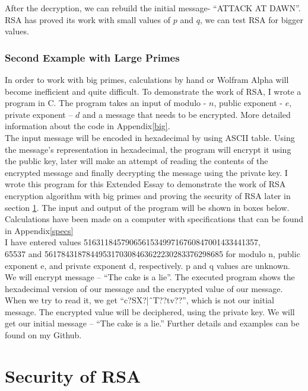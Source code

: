 \documentclass[a4paper, 12pt]{article}
\begin{document}
After the decryption, we can rebuild the initial message- “ATTACK AT DAWN”.
RSA has proved its work with small values of $p$ and $q$, we can test RSA for bigger values.\\

\subsubsection{Second Example with Large Primes}
\label{bbsec:second}

In order to work with big primes, calculations by hand or Wolfram Alpha will become inefficient
and quite difficult. To demonstrate the work of RSA, I wrote a program in C. 
The program takes an input of modulo - $n$, public exponent - $e$, private exponent – $d$
and a message that needs to be encrypted. More detailed information about the code in Appendix\ref{big}.\\
The input message will be encoded in hexadecimal by using ASCII table. Using
the message’s representation in hexadecimal, the program will encrypt it using the public key, later
will make an attempt of reading the contents of the encrypted message and finally decrypting the
message using the private key. I wrote this program for this Extended Essay to demonstrate the
work of RSA encryption algorithm with big primes and proving the security of RSA later in section \ref{sec:security}.
The input and output of the program will be shown in boxes below. Calculations have been
made on a computer with specifications that can be found in Appendix\ref{specs}\\

I have entered values 516311845790656153499716760847001433441357,\\ 65537 and
5617843187844953170308463622230283376298685 for modulo n, public exponent e, and private
exponent d, respectively. p and q values are unknown. We will encrypt message – “The cake is a
lie”. The executed program shows the hexadecimal version of our message and the encrypted
value of our message. When we try to read it, we get “c?SX?|ˆT??tv??”, which is not our
initial message. The encrypted value will be deciphered, using the private key. We will get our
initial message – “The cake is a lie.” Further details and examples can be found on my Github\cite{github}.\\

\section{Security of RSA}
\label{sec:security}
\end{document}
